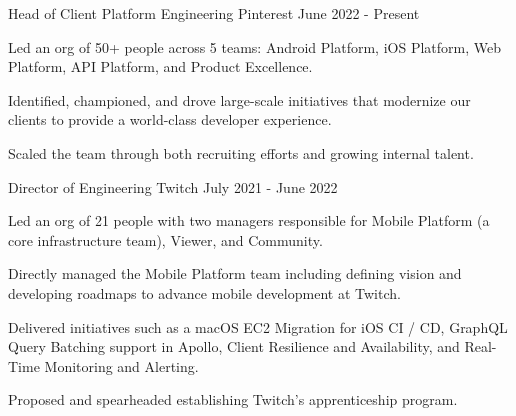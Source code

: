 

\begin{cventries}

  \cventry
    {Head of Client Platform Engineering} %
    {Pinterest} %
    {} %
    {June 2022 - Present} %
    {
	\begin{cvitems} %
	\item Led an org of 50+ people across 5 teams: Android Platform, iOS Platform, Web Platform, API Platform, and Product Excellence.	
	\item Identified, championed, and drove large-scale initiatives that modernize our clients to provide a world-class developer experience.
	\item Scaled the team through both recruiting efforts and growing internal talent.
	\end{cvitems}
    }

  \cventry
    {Director of Engineering} %
    {Twitch} %
    {} %
    {July 2021 - June 2022} %
    {
	\begin{cvitems} %
	\item Led an org of 21 people with two managers responsible for Mobile Platform (a core infrastructure team), Viewer, and Community.
	\item Directly managed the Mobile Platform team including defining vision and developing roadmaps to advance mobile development at Twitch.
	\item Delivered initiatives such as a macOS EC2 Migration for iOS CI / CD, GraphQL Query Batching support in Apollo, Client Resilience and Availability, and Real-Time Monitoring and Alerting.
	\item Proposed and spearheaded establishing Twitch’s apprenticeship program.
	\end{cvitems}
    }


\end{cventries}
